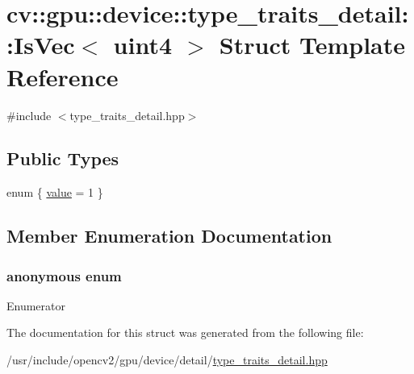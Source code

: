 \hypertarget{structcv_1_1gpu_1_1device_1_1type__traits__detail_1_1IsVec_3_01uint4_01_4}{\section{cv\-:\-:gpu\-:\-:device\-:\-:type\-\_\-traits\-\_\-detail\-:\-:Is\-Vec$<$ uint4 $>$ Struct Template Reference}
\label{structcv_1_1gpu_1_1device_1_1type__traits__detail_1_1IsVec_3_01uint4_01_4}
}


{\ttfamily \#include $<$type\-\_\-traits\-\_\-detail.\-hpp$>$}

\subsection*{Public Types}
\begin{DoxyCompactItemize}
\item 
enum \{ \hyperlink{structcv_1_1gpu_1_1device_1_1type__traits__detail_1_1IsVec_3_01uint4_01_4_a061090b5c6d3b7fe2b1fa78c6005e114a377b959be8c0acbda7b8432e04a48979}{value} = 1
 \}
\end{DoxyCompactItemize}


\subsection{Member Enumeration Documentation}
\hypertarget{structcv_1_1gpu_1_1device_1_1type__traits__detail_1_1IsVec_3_01uint4_01_4_a061090b5c6d3b7fe2b1fa78c6005e114}{\subsubsection[{anonymous enum}]{\setlength{\rightskip}{0pt plus 5cm}anonymous enum}}\label{structcv_1_1gpu_1_1device_1_1type__traits__detail_1_1IsVec_3_01uint4_01_4_a061090b5c6d3b7fe2b1fa78c6005e114}
\begin{Desc}
\item[Enumerator]\par
\begin{description}
\item[{\em 
\hypertarget{structcv_1_1gpu_1_1device_1_1type__traits__detail_1_1IsVec_3_01uint4_01_4_a061090b5c6d3b7fe2b1fa78c6005e114a377b959be8c0acbda7b8432e04a48979}{value}\label{structcv_1_1gpu_1_1device_1_1type__traits__detail_1_1IsVec_3_01uint4_01_4_a061090b5c6d3b7fe2b1fa78c6005e114a377b959be8c0acbda7b8432e04a48979}
}]\end{description}
\end{Desc}


The documentation for this struct was generated from the following file\-:\begin{DoxyCompactItemize}
\item 
/usr/include/opencv2/gpu/device/detail/\hyperlink{type__traits__detail_8hpp}{type\-\_\-traits\-\_\-detail.\-hpp}\end{DoxyCompactItemize}
